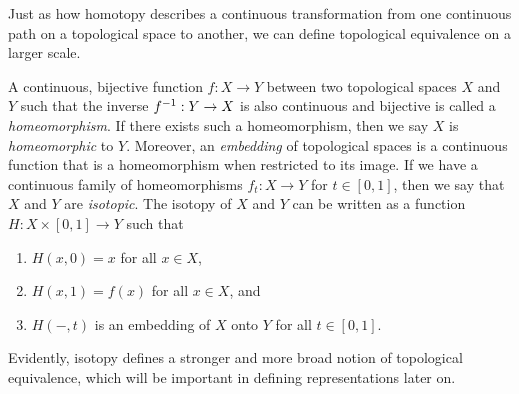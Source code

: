 Just as how homotopy describes a continuous transformation from one continuous path on a topological space to another, we can define topological equivalence on a larger scale.
\begin{definition}
    A continuous, bijective function $f:X\to Y$ between two topological spaces $X$ and $Y$ such that the inverse ${ f }^{-1}:Y\to X$ is also continuous and bijective is called a \textit{homeomorphism}. If there exists such a homeomorphism, then we say $X$ is \textit{homeomorphic} to $Y$. Moreover, an \textit{embedding} of topological spaces is a continuous function that is a homeomorphism when restricted to its image. If we have a continuous family of homeomorphisms $f_t:X\to Y$ for $t\in[0,1]$, then we say that $X$ and $Y$ are \textit{isotopic}. The isotopy of $X$ and $Y$ can be written as a function $H:X\times[0,1]\to Y$ such that
    \begin{enumerate}
        \item $H(x,0)=x$ for all $x\in X$, 
        \item $H(x,1)=f(x)$ for all $x\in X$, and
        \item $H(-,t)$ is an embedding of $X$ onto $Y$ for all $t\in[0,1]$.
    \end{enumerate}
\end{definition}
Evidently, isotopy defines a stronger and more broad notion of topological equivalence, which will be important in defining representations later on.